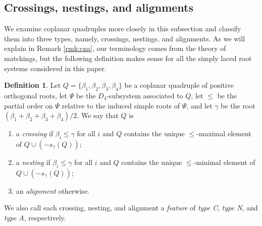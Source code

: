 \documentclass[11pt]{amsart}
\theoremstyle{plain}
\theoremstyle{definition}
\newtheorem{defn}[theorem]{Definition}
\theoremstyle{remark}
\numberwithin{equation}{subsection}
\newcommand{\be}{\beta}
\newcommand{\coplanar}{coplanar\xspace}
\begin{document}
\subsection{Crossings, nestings, and alignments}

We examine coplanar quadruples more closely in this subsection and classify them
into three types, namely, crossings, nestings, and alignments. As we will
explain in Remark \ref{rmk:cna}, our terminology comes from the theory of
matchings, but the following definition makes sense for all the simply laced
root systems considered in this paper.


\begin{defn}\label{def:nestcross}
Let $Q = \{\be_1, \be_2, \be_3, \be_4\}$ be a \coplanar quadruple of positive
orthogonal roots, let $\Psi$ be the $D_4$-subsystem associated to $Q$, let
$\leq$ be the partial order on $\Psi$ relative to the induced simple roots of
$\Psi$, and let $\gamma$ be the root $(\be_1 + \be_2 + \be_3 + \be_4)/2$. We say
that $Q$ is
\begin{enumerate}
    \item[{\rm (i)}]{a {\it crossing} if $\be_i \leq \gamma$ for all $i$ and $Q$
     contains the unique $\leq$-maximal element of $Q \cup (-s_\gamma(Q))$;}
 \item[{\rm (ii)}]{a {\it nesting} if $\be_i \leq \gamma$ for all $i$ and $Q$
     contains the unique $\leq$-minimal element of $Q \cup (-s_\gamma(Q))$;}
 \item[{\rm (iii)}]{an {\it alignment} otherwise.}
\end{enumerate} We also call each crossing, nesting, and alignment a
    \emph{feature} of \emph{type C}, \emph{type N}, and \emph{type A},
    respectively.
\end{defn}
\end{document}
